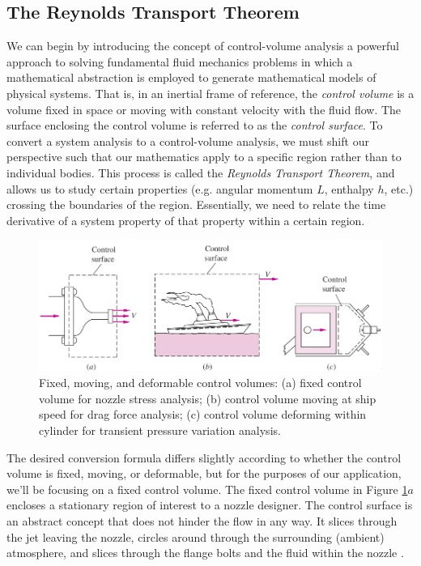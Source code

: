 \documentclass[11pt]{article} %
\numberwithin{equation}{section} %
\begin{document}
\subsection{The Reynolds Transport Theorem}
We can begin by introducing the concept of control-volume analysis \textemdash{} a powerful approach to solving fundamental fluid mechanics problems \textemdash{} in which a mathematical abstraction is employed to generate mathematical models of physical systems. That is, in an inertial frame of reference, the \textit{control volume} is a volume fixed in space or moving with constant velocity with the fluid flow. The surface enclosing the control volume is referred to as the \textit{control surface}. To convert a system analysis to a control-volume analysis, we must shift our perspective such that our mathematics apply to a specific region rather than to individual bodies. This process is called the \textit{Reynolds Transport Theorem}, and allows us to study certain properties (e.g. angular momentum $L$, enthalpy $h$, etc.) crossing the boundaries of the region. Essentially, we need to relate the time derivative of a system property of that property within a certain region.
\begin{figure}[h] \label{fig:control-types}
\centering
\includegraphics[scale=0.5]{control_types}
\caption{Fixed, moving, and deformable control volumes: (a) fixed control volume for nozzle stress analysis; (b) control volume moving at ship speed for drag force analysis; (c) control volume deforming within cylinder for transient pressure variation analysis.}
\end{figure}

The desired conversion formula differs slightly according to whether the control volume is fixed, moving, or deformable, but for the purposes of our application, we'll be focusing on a fixed control volume. The fixed control volume in Figure \ref{fig:control-types}$a$ encloses a stationary region of interest to a nozzle designer. The control surface is an abstract concept that does not hinder the flow in any way. It slices through the jet leaving the nozzle, circles around through the surrounding (ambient) atmosphere, and slices through the flange bolts and the fluid within the nozzle \cite{fluid-mechanics}.
\end{document}
